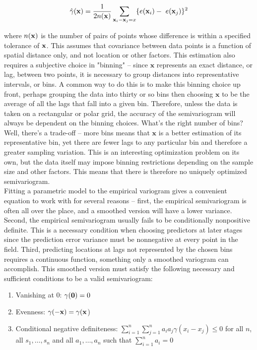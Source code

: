 \documentclass[12pt]{amsart}
\begin{document}
\begin{align*} 
   \hat\gamma(\bold{x}) = { 1 \over {2n(\bold{x})}} \sum_{\bold{x}_i - \bold{x}_j = x} \{ e(\bold{x}_i) - \
   e(\bold{x}_j) \} ^2
\end{align*}

\noindent where $n(\bold{x})$ is the number of pairs of points whose difference is within a specified tolerance of $\bold{x}$. This assumes that covariance between data points is a function of spatial distance only, and not location or other factors. This estimation also requires a subjective choice in "binning" -- since $\mathbf{x}$ represents an exact distance, or lag, between two points, it is necessary to group distances into representative intervals, or bins. A common way to do this is to make this binning choice up front, perhaps grouping the data into thirty or so bins then choosing $\mathbf{x}$ to be the average of all the lags that fall into a given bin. Therefore, unless the data is taken on a rectangular or polar grid, the accuracy of the semivariogram will always be dependent on the binning choices. What's the right number of bins? Well, there's a trade-off -- more bins means that $\mathbf{x}$ is a better estimation of its representative bin, yet there are fewer lags to any particular bin and therefore a greater sampling variation. This is an interesting optimization problem on its own, but the data itself may impose binning restrictions depending on the sample size and other factors. This means that there is therefore no uniquely optimized semivariogram. \\

Fitting a parametric model to the empirical variogram gives a convenient equation to work with for several reasons -- first, the empirical semivariogram is often all over the place, and a smoothed version will have a lower variance. Second, the empirical semivariogram usually fails to be conditionally nonpositive definite. This is a necessary condition when choosing predictors at later stages since the prediction error variance must be nonnegative at every point in the field. Third, predicting locations at lags not represented by the chosen bins requires a continuous function, something only a smoothed variogram can accomplish. This smoothed version must satisfy the following necessary and sufficient conditions to be a valid semivariogram: \\

\begin{enumerate}

\item Vanishing at 0: $\gamma(\bold{0}) = 0$
\item Evenness: $\gamma(-\bold{x}) = \gamma(\bold{x}$)
\item Conditional negative definiteness: $\sum_{i=1}^n \sum_{j=1}^n a_i a_j \gamma(x_i - x_j) \leq 0$ for all $n$, all $s_1, \dots, s_n$ and all $a_1, \dots, a_n$ such that $\sum_{i=1}^n a_i = 0$

\end{enumerate}
\end{document}
